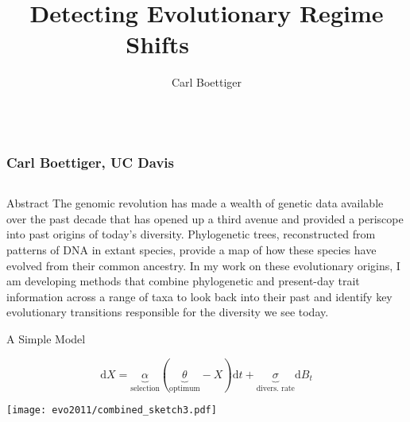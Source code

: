 \documentclass[final,hyperref={pdfpagelabels=false},xcolor=svgnames]{beamer}
\title[]{\VeryHuge \textbf{Detecting Evolutionary Regime Shifts $\phantom{longword}$ }}
\author{Carl Boettiger}
\institute{Center for Population Biology, University of California, Davis}
\newcommand{\ud}{\mathrm{d}}
\begin{document}
  \begin{frame}[t] 

\frametitle{\\ \LARGE{\hspace{1cm} Carl Boettiger, UC Davis}}
\vspace{4cm}



\begin{columns}[t] %
\begin{column}{.20\paperwidth}
{\LARGE Abstract }
The genomic revolution has made a wealth of genetic data available over the past
decade that has opened up a third avenue and provided a periscope into past origins of
today's diversity. Phylogenetic trees, reconstructed from patterns of DNA in extant
species, provide a map of how these species have evolved from their common ancestry.
In my work on these evolutionary origins, I am developing methods that combine
phylogenetic and present-day trait information across a range of taxa to look back into
their past and identify key evolutionary transitions responsible for the diversity we see
today.
  \vspace{1cm}

\begin{center}
{\LARGE A Simple Model} 

  $$  \ud X = \underbrace{\alpha}_{\textrm{selection}} (\underbrace{\theta}_{\textrm{optimum}} - X) \ud t + \underbrace{\sigma}_{\textrm{divers. rate}} \ud B_t  $$

  \texttt{[image: evo2011/combined\_sketch3.pdf]}



  \end{center}



\end{column}


\end{columns}
\end{frame}
\end{document}
